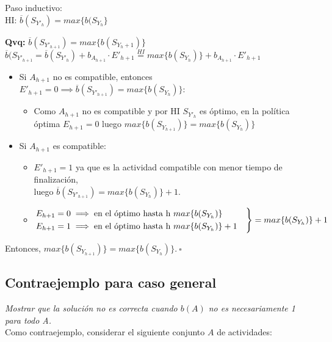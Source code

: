 \documentclass[10pt, a4paper]{article}
\begin{document}
Paso inductivo: \\

HI: $\overline{b}(S_{Y'_h}) = max\{b(S_{Y_h}\}$  

\textbf{Qvq:} $\overline{b}(S_{Y'_{h+1}}) = max\{b(S_{Y_h+1})\}$ \\

$\overline{b}(S_{Y'_{h+1}} = \overline{b}(S_{Y'_h}) + b_{A_{h+1}} \cdot E'_{h+1} \overset{HI}{=} max\{b(S_{Y_h})\} + b_{A_{h+1}} \cdot E'_{h+1}$

\begin{itemize}
    \item Si $A_{h+1}$ no es compatible, entonces $E'_{h+1} = 0 \implies \overline{b}(S_{Y'_{h+1}}) = max\{b(S_{Y_h})\}$: \begin{itemize}
        \item Como $A_{h+1}$ no es compatible y por HI $S_{Y'_h}$ es óptimo, en la política óptima $E_{h+1} = 0$ luego $max\{b(S_{Y_{h+1}})\} = max\{b(S_{Y_h})\}$
        \end{itemize}
    \item Si $A_{h+1}$ es compatible: \begin{itemize}
        \item $E'_{h+1} = 1$ ya que es la actividad compatible con menor tiempo de finalización, \\ luego $\overline{b}(S_{Y'_{h+1}}) = max\{b(S_{Y_h})\} + 1$.
        \item $$\begin{rcases} E_{h+1} = 0 \implies \text{en el óptimo hasta h} \ max\{b(S_{Y_h})\} & \\
              E_{h+1} = 1 \implies \text{en el óptimo hasta h} \ max\{b(S_{Y_h})\} + 1 & 
            \end{rcases} = max\{b(S_{Y_h})\} + 1$$
    \end{itemize}
\end{itemize}

Entonces, $max\{b(S_{Y_{h+1}})\} = max\{b(S_{Y_h})\}. \ \square$

\subsection{Contraejemplo para caso general}
\emph{Mostrar que la solución no es correcta cuando $b(A)$ no es necesariamente 1 para todo A.} \\

Como contraejemplo, considerar el siguiente conjunto $A$ de actividades: \\
\end{document}
